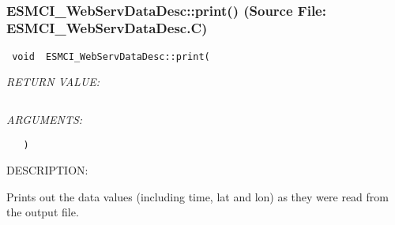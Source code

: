  
\mbox{}\hrulefill\
 
\subsubsection{ESMCI\_WebServDataDesc::print() (Source File: ESMCI\_WebServDataDesc.C)}


  
\begin{verbatim} void  ESMCI_WebServDataDesc::print(\end{verbatim}{\em RETURN VALUE:}
\begin{verbatim} \end{verbatim}{\em ARGUMENTS:}
\begin{verbatim}   )\end{verbatim}
{\sf DESCRIPTION:\\ }


      Prints out the data values (including time, lat and lon) as they were
      read from the output file.
  
\setlength{\parskip}{\oldparskip}
\setlength{\parindent}{\oldparindent}
\setlength{\baselineskip}{\oldbaselineskip}
